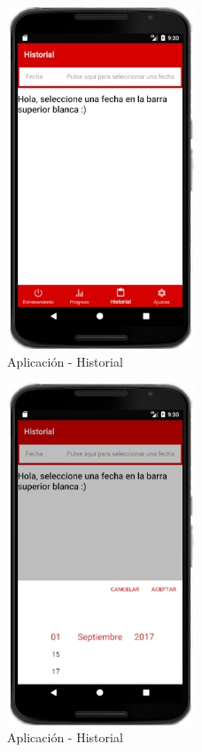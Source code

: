 \documentclass[a4paper, 11pt]{article}
\begin{document}
\begin{itemize}
                  \begin{figure}[H]
                   \centering
                   \includegraphics[width=0.5\textwidth]{6historial}
                   \caption{Aplicación - Historial}
                   \label{f:app-historial}
                  \end{figure}

                  \begin{figure}[H]
                   \centering
                   \includegraphics[width=0.5\textwidth]{7historial-fecha}
                   \caption{Aplicación - Historial}
                   \label{f:app-historial-fecha}
                  \end{figure}


\end{itemize}
\end{document}
